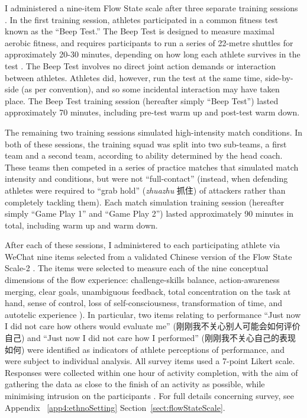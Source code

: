 \begin{CJK}{UTF8}{gbsn}
I administered a nine-item Flow State scale \citep{Jackson2002} after three separate training sessions .   In the first training session, athletes participated in a common fitness test known as the ``Beep Test.''  The Beep Test is designed to measure maximal aerobic fitness, and requires participants to run a series of 22-metre shuttles for approximately 20-30 minutes, depending on how long each athlete survives in the test \citep[see][]{Stickland2003}.  The Beep Test involves no direct joint action demands or interaction between athletes.  Athletes did, however, run the test at the same time, side-by-side (as per convention), and so some incidental interaction may have taken place.  The Beep Test training session (hereafter simply ``Beep Test'') lasted approximately 70 minutes, including pre-test warm up and post-test warm down.

The remaining two training sessions simulated high-intensity match conditions. In both of these sessions, the training squad was split into two sub-teams, a first team and a second team, according to ability determined by the head coach.  These teams then competed in a series of practice matches that simulated match intensity and conditions, but were not ``full-contact'' (instead, when defending athletes were required to ``grab hold'' (\textit{zhuazhu} 抓住) of attackers rather than completely tackling them).  Each match simulation training session (hereafter simply ``Game Play 1'' and ``Game Play 2'') lasted approximately 90 minutes in total, including warm up and warm down.

After each of these sessions, I administered to each participating athlete via WeChat nine items selected from a validated Chinese version \citep{Liu2012} of the Flow State Scale-2 \citep{Jackson2002}.  The items were selected to measure each of the nine conceptual dimensions of the flow experience: challenge-skills balance, action-awareness merging, clear goals, unambiguous feedback, total concentration on the task at hand, sense of control, loss of self-consciousness, transformation of time, and autotelic experience \citep{Csikszentmihalyi1990}).  In particular, two items relating to performance ``Just now I did not care how others would evaluate me'' (刚刚我不关心别人可能会如何评价自己) and ``Just now I did not care how I performed'' (刚刚我不关心自己的表现如何) were identified as indicators of athlete perceptions of performance, and were subject to individual analysis. All survey items used a 7-point Likert scale.  Responses were collected within one hour of activity completion, with the aim of gathering the data as close to the finish of an activity as possible, while minimising intrusion on the participants \citep{Jackson2004}. For full details concerning survey, see Appendix ~\ref{app4:ethnoSetting} Section~\ref{sect:flowStateScale}.


\end{CJK}
